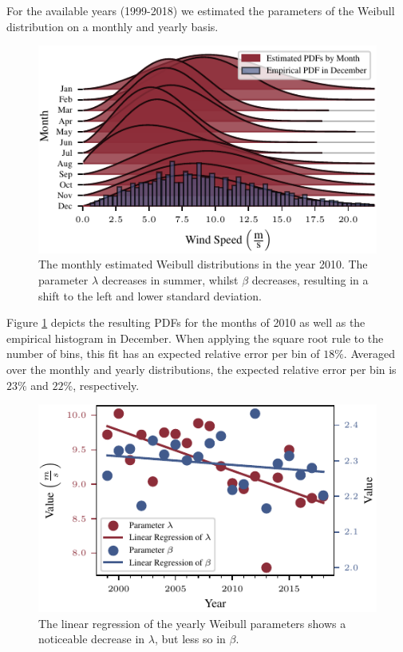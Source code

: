 \documentclass{article}
\theoremstyle{plain}
\theoremstyle{definition}
\theoremstyle{remark}
\begin{document}
For the available years (1999-2018) we estimated the parameters of the Weibull distribution on a monthly and yearly basis. 
\begin{figure}
    \centering 
    \includegraphics{fig/monthly_weibull.pdf}
    \caption{The monthly estimated Weibull distributions in the year 2010. The parameter $\lambda$ decreases in summer, whilst $\beta$ decreases, resulting in a shift to the left and lower standard deviation.}
    \label{fig:monthly_weibull}
\end{figure}
Figure \ref{fig:monthly_weibull} depicts the resulting PDFs for the months of 2010 as well as the
empirical histogram in December.  When applying the square root rule to the number of bins,
this fit has an expected relative error per bin of $18 \%$.  Averaged over the monthly and yearly
distributions, the expected relative error per bin is  $23 \%$ and $22 \%$, respectively.

\begin{figure}
    \centering
    \includegraphics{fig/linreg_parameters.pdf}
    \caption{The linear regression of the yearly Weibull parameters shows a noticeable decrease in 
 \textcolor{TUred}{$\lambda$}, but less so in \textcolor{TUdarkblue}{$\beta$}.}
    \label{fig:lin_reg}
\end{figure}
\end{document}
